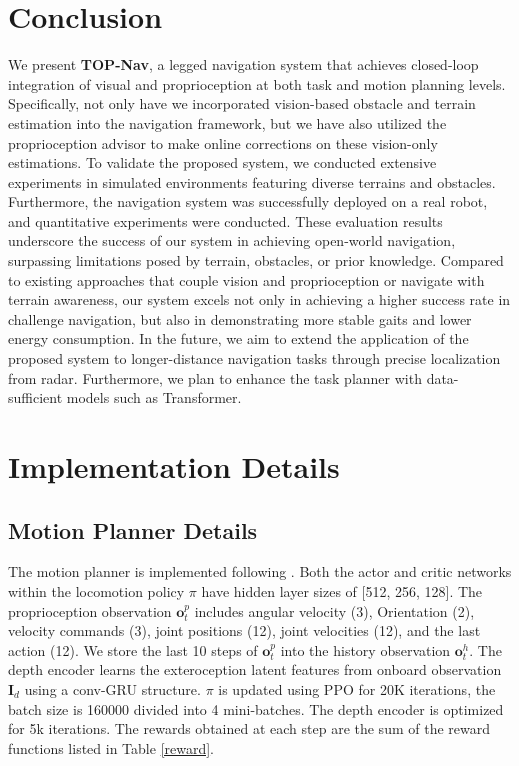 \documentclass[conference]{IEEEtran}
\begin{document}
\section*{Conclusion}
We present \textbf{TOP-Nav}, a legged navigation system that achieves closed-loop integration of visual and proprioception at both task and motion planning levels. Specifically, not only have we incorporated vision-based obstacle and terrain estimation into the navigation framework, but we have also utilized the proprioception advisor to make online corrections on these vision-only estimations. To validate the proposed system, we conducted extensive experiments in simulated environments featuring diverse terrains and obstacles. Furthermore, the navigation system was successfully deployed on a real robot, and quantitative experiments were conducted. These evaluation results underscore the success of our system in achieving open-world navigation, surpassing limitations posed by terrain, obstacles, or prior knowledge. Compared to existing approaches that couple vision and proprioception or navigate with terrain awareness, our system excels not only in achieving a higher success rate in challenge navigation, but also in demonstrating more stable gaits and lower energy consumption. In the future, we aim to extend the application of the proposed system to longer-distance navigation tasks through precise localization from radar. Furthermore, we plan to enhance the task planner with data-sufficient models such as Transformer.




\clearpage

\section{Implementation Details}
\subsection{Motion Planner Details}
The motion planner is implemented following \cite{cheng2023extreme}. Both the actor and critic networks within the locomotion policy ${\pi}$ have hidden layer sizes of [512, 256, 128]. The proprioception observation $\bm{o}_t^p$ includes angular velocity (3), Orientation (2), velocity commands (3), joint positions (12), joint velocities (12), and the last action (12). We store the last 10 steps of $\bm{o}_t^p$ into the history observation $\bm{o}_t^h$. The depth encoder learns the exteroception latent features from onboard observation $\bm{I}_d$ using a conv-GRU structure. ${\pi}$ is updated using PPO \cite{schulman2017proximal} for 20K iterations, the batch size is 160000 divided into 4 mini-batches. The depth encoder is optimized for 5k iterations. The rewards obtained at each step are the sum of the reward functions listed in Table \ref{reward}. 
\end{document}
